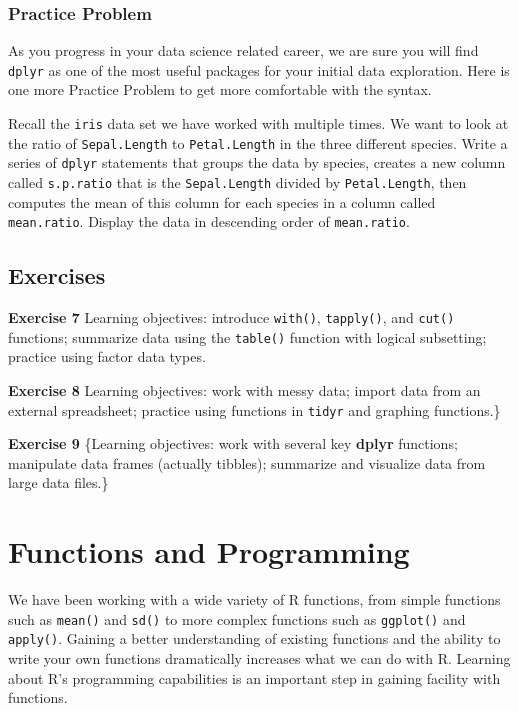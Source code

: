 \documentclass[]{krantz}
\begin{document}
\subsection{Practice Problem}\label{practice-problem-10}

As you progress in your data science related career, we are sure you
will find \texttt{dplyr} as one of the most useful packages for your
initial data exploration. Here is one more Practice Problem to get more
comfortable with the syntax.

Recall the \texttt{iris} data set we have worked with multiple times. We
want to look at the ratio of \texttt{Sepal.Length} to
\texttt{Petal.Length} in the three different species. Write a series of
\texttt{dplyr} statements that groups the data by species, creates a new
column called \texttt{s.p.ratio} that is the \texttt{Sepal.Length}
divided by \texttt{Petal.Length}, then computes the mean of this column
for each species in a column called \texttt{mean.ratio}. Display the
data in descending order of \texttt{mean.ratio}.

\section{Exercises}\label{exercises-3}

\textbf{Exercise 7} Learning objectives: introduce \texttt{with()},
\texttt{tapply()}, and \texttt{cut()} functions; summarize data using
the \texttt{table()} function with logical subsetting; practice using
factor data types.

\textbf{Exercise 8} Learning objectives: work with messy data; import
data from an external spreadsheet; practice using functions in
\texttt{tidyr} and graphing functions.\}

\textbf{Exercise 9} \{Learning objectives: work with several key
\textbf{dplyr} functions; manipulate data frames (actually tibbles);
summarize and visualize data from large data files.\}

\chapter{Functions and Programming}\label{functions}

We have been working with a wide variety of R functions, from simple
functions such as \texttt{mean()} and \texttt{sd()} to more complex
functions such as \texttt{ggplot()} and \texttt{apply()}. Gaining a
better understanding of existing functions and the ability to write your
own functions dramatically increases what we can do with R. Learning
about R's programming capabilities is an important step in gaining
facility with functions.
\end{document}
